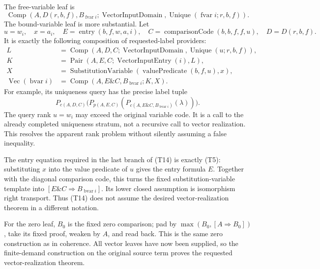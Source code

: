 The free-variable leaf is
\[
 \operatorname{Comp}(A,D(r,b,f),B_{\operatorname{fvar}i};
      \operatorname{VectorInputDomain},
      \operatorname{Unique}(\operatorname{fvar}i;r,b,f)).        \tag{T13}
\]
The bound-variable leaf is more substantial.  Let
\[
 u=w_i,\quad x=a_i,\quad
 E=\operatorname{entry}(b,f,w,a,i),\quad
 C=\operatorname{comparisonCode}(b,b,f,f,u),\quad D=D(r,b,f).
\]
It is exactly the following composition of requested-label providers:
\[
\begin{aligned}
 L&=\operatorname{Comp}(A,D,C;
          \operatorname{VectorInputDomain},
          \operatorname{Unique}(u;r,b,f)),\\
 K&=\operatorname{Pair}(A,E,C;
          \operatorname{VectorInputEntry}(i),L),\\
 X&=\operatorname{SubstitutionVariable}
       (\operatorname{valuePredicate}(b,f,u),x),\\
 \operatorname{Vec}(\operatorname{bvar}i)
   &=\operatorname{Comp}(A,E\mathbin{\&}C,B_{\operatorname{bvar}i};K,X).
\end{aligned}                                                   \tag{T14}
\]
For example, its uniqueness query has the precise label tuple
\[
 P_{c(A,D,C)}\bigl(P_{p(A,E,C)}(
     P_{c(A,E\mathbin{\&}C,B_{\operatorname{bvar}i})}(\lambda))\bigr).
\]
The query rank $u=w_i$ may exceed the original variable code.  It is
a call to the already completed uniqueness stratum, not a recursive
call to vector realization.  This resolves the apparent rank problem
without silently assuming a false inequality.

The entry equation required in the last branch of (T14) is exactly
(T5): substituting $x$ into the value predicate of $u$ gives the
entry formula $E$.  Together with the diagonal comparison code, this
turns the fixed substitution-variable template into
$[E\mathbin{\&}C\Rightarrow B_{\operatorname{bvar}i}]$.
Its lower closed assumption is isomorphism right transport.  Thus
(T14) does not assume the desired vector-realization theorem in a
different notation.

For the zero leaf, $B_0$ is the fixed zero comparison; pad by
$\max(B_0,[A\Rightarrow B_0])$, take its fixed proof, weaken by
$A$, and read back.  This is the same zero construction as in
coherence.  All vector leaves have now been supplied, so the
finite-demand construction on the original source term proves the
requested vector-realization theorem.

